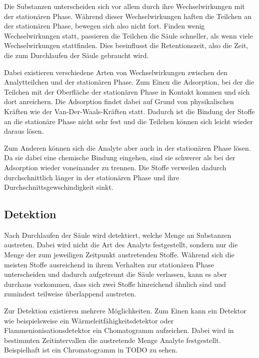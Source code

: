 Die Substanzen unterscheiden sich vor allem durch ihre Wechselwirkungen mit der stationären Phase. Während dieser Wechselwirkungen haften die Teilchen an der stationären Phase, bewegen sich also nicht fort. Finden wenig Wechselwirkungen statt, passieren die Teilchen die Säule schneller, als wenn viele Wechselwirkungen stattfinden. Dies beeinflusst die Retentionszeit, also die Zeit, die zum Durchlaufen der Säule gebraucht wird.

Dabei existieren verschiedene Arten von Wechselwirkungen zwischen den Analytteilchen und der stationären Phase. Zum Einen die Adsorption, bei der die Teilchen mit der Oberfläche der stationären Phase in Kontakt kommen und sich dort anreichern. Die Adsorption findet dabei auf Grund von physikalischen Kräften wie der Van-Der-Waals-Kräften statt. Dadurch ist die Bindung der Stoffe an die stationäre Phase nicht sehr fest und die Teilchen können sich leicht wieder daraus lösen.


Zum Anderen können sich die Analyte aber auch in der stationären Phase lösen. Da sie dabei eine chemische Bindung eingehen, sind sie schwerer als bei der Adsorption wieder voneinander zu trennen. Die Stoffe verweilen dadurch durchschnittlich länger in der stationären Phase und ihre Durchschnittsgewschindigkeit sinkt.



\subsection{Detektion}
Nach Durchlaufen der Säule wird detektiert, welche Menge an Substanzen austreten. Dabei wird nicht die Art des Analyts festgestellt, sondern nur die Menge der zum jeweiligen Zeitpunkt austretenden Stoffe. Während sich die meisten Stoffe ausreichend in ihrem Verhalten zur stationären Phase unterscheiden und dadurch aufgetrennt die Säule verlassen, kann es aber durchaus vorkommen, dass sich zwei Stoffe hinreichend ähnlich sind und  zumindest teilweise überlappend austreten.

Zur Detektion existieren mehrere Möglichkeiten. Zum Einen kann ein Detektor wie beispielsweise ein Wärmeleitfähigkeitsdetektor oder Flammenionisationsdetektor ein Chomatogramm aufzeichen. Dabei wird in bestimmten Zeitintervallen die austretende Menge Analyte festgestellt. Beispielhaft ist ein Chromatogramm in TODO zu sehen. 

